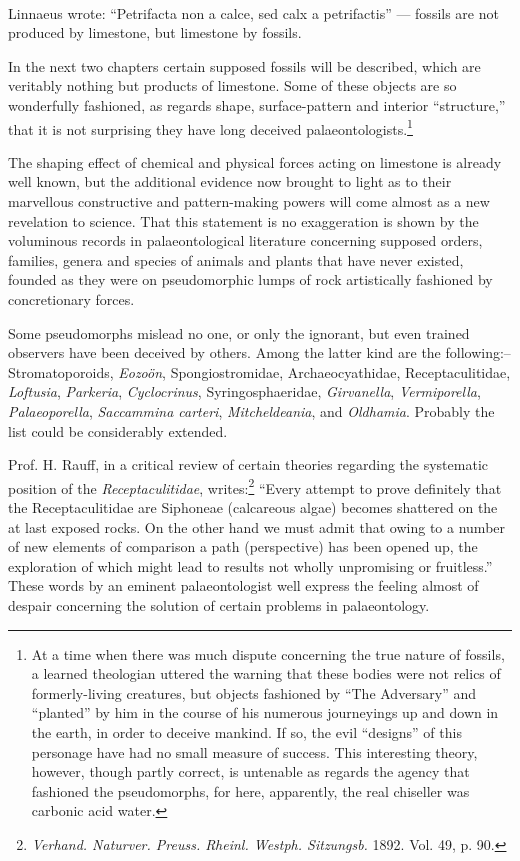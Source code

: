 \documentclass[a4paper, 12pt, oneside]{article}
\begin{document}
\paragraph{}
Linnaeus wrote: ``Petrifacta non a calce, sed calx a petrifactis'' --- fossils are not produced by limestone, but limestone by fossils.

In the next two chapters certain supposed fossils will be described, which are veritably nothing but products of limestone. Some of these objects are so wonderfully fashioned, as regards shape, surface-pattern and interior ``structure,'' that it is not surprising they have long deceived palaeontologists.\footnote{At a time when there was much dispute concerning the true nature of fossils, a learned theologian uttered the warning that these bodies were not relics of formerly-living creatures, but objects fashioned by ``The Adversary'' and ``planted'' by him in the course of his numerous journeyings up and down in the earth, in order to deceive mankind. If so, the evil ``designs'' of this personage have had no small measure of success. This interesting theory, however, though partly correct, is untenable as regards the agency that fashioned the pseudomorphs, for here, apparently, the real chiseller was carbonic acid water.}

The shaping effect of chemical and physical forces acting on limestone is already well known, but the additional evidence now brought to light as to their marvellous constructive and pattern-making powers will come almost as a new revelation to science. That this statement is no exaggeration is shown by the voluminous records in palaeontological literature concerning supposed orders, families, genera and species of animals and plants that have never existed, founded as they were on pseudomorphic lumps of rock artistically fashioned by concretionary forces.

Some pseudomorphs mislead no one, or only the ignorant, but even trained observers have been deceived by others. Among the latter kind are the following:-- Stromatoporoids, \emph{Eozoön}, Spongiostromidae, Archaeocyathidae, Receptaculitidae, \emph{Loftusia}, \emph{Parkeria}, \emph{Cyclocrinus}, Syringosphaeridae, \emph{Girvanella}, \emph{Vermiporella}, \emph{Palaeoporella}, \emph{Saccammina carteri}, \emph{Mitcheldeania}, and \emph{Oldhamia}. Probably the list could be considerably extended.

Prof. H. Rauff, in a critical review of certain theories regarding the systematic position of the \emph{Receptaculitidae}, writes:\footnote{\emph{Verhand. Naturver. Preuss. Rheinl. Westph. Sitzungsb.} 1892. Vol. 49, p. 90.} ``Every attempt to prove definitely that the Receptaculitidae are Siphoneae (calcareous algae) becomes shattered on the at last exposed rocks. On the other hand we must admit that owing to a number of new elements of comparison a path (perspective) has been opened up, the exploration of which might lead to results not wholly unpromising or fruitless.'' These words by an eminent palaeontologist well express the feeling almost of despair concerning the solution of certain problems in palaeontology.
\end{document}
